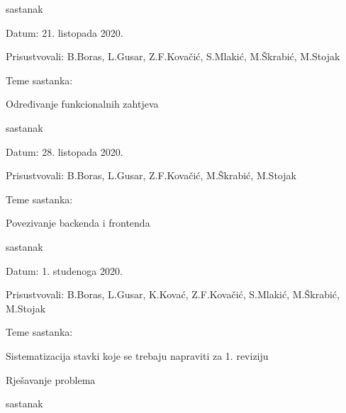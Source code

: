 \begin{packed_enum}
			\item  sastanak
			\item[] \begin{packed_item}
				\item Datum: 21. listopada 2020.
				\item Prisustvovali: B.Boras, L.Gusar, Z.F.Kovačić, S.Mlakić, M.Škrabić, M.Stojak
				\item Teme sastanka:
				\begin{packed_item}
					\item  Određivanje funkcionalnih zahtjeva\\
				\end{packed_item}
			\end{packed_item}
		
			\item  sastanak
			\item[] \begin{packed_item}
				\item Datum: 28. listopada 2020.
				\item Prisustvovali:  B.Boras, L.Gusar, Z.F.Kovačić, M.Škrabić, M.Stojak
				\item Teme sastanka:
				\begin{packed_item}
					\item  Povezivanje backenda i frontenda\\
				\end{packed_item}
			\end{packed_item}
		\newpage
			\item  sastanak
			
			\item[] \begin{packed_item}
				\item Datum:  1. studenoga 2020.
				\item Prisustvovali: B.Boras, L.Gusar, K.Kovać, Z.F.Kovačić, S.Mlakić, M.Škrabić, M.Stojak
				\item Teme sastanka:
				\begin{packed_item}
					\item  Sistematizacija stavki koje se trebaju napraviti za 1. reviziju
					\item  Rješavanje problema\\
				\end{packed_item}
			\end{packed_item}
		
			\item sastanak
			

\end{packed_enum}
